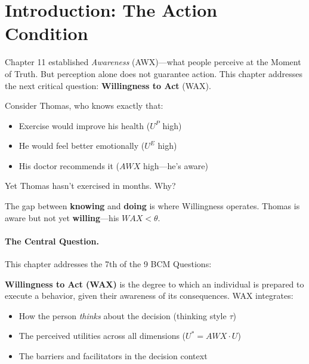 
\section{Introduction: The Action Condition}
\label{sec:12-intro}


Chapter 11 established \textit{Awareness} (AWX)---what people perceive at the
Moment of Truth. But perception alone does not guarantee action. This chapter
addresses the next critical question: \textbf{Willingness to Act} (WAX).

\begin{intuition}
Consider Thomas, who knows exactly that:
\begin{itemize}[nosep]
  \item Exercise would improve his health ($U^P$ high)
  \item He would feel better emotionally ($U^E$ high)
  \item His doctor recommends it ($AWX$ high---he's aware)
\end{itemize}
Yet Thomas hasn't exercised in months. Why?

The gap between \textbf{knowing} and \textbf{doing} is where Willingness operates.
Thomas is aware but not yet \textbf{willing}---his $WAX < \theta$.
\end{intuition}

\paragraph{The Central Question.}
This chapter addresses the 7th of the 9 BCM Questions:

\begin{center}
\end{center}

\begin{definition}
\textbf{Willingness to Act (WAX)} is the degree to which an individual is prepared
to execute a behavior, given their awareness of its consequences. WAX integrates:
\begin{itemize}[nosep]
\item How the person \textit{thinks} about the decision (thinking style $\tau$)
\item The perceived utilities across all dimensions ($U^* = AWX \cdot U$)
\item The barriers and facilitators in the decision context
\end{itemize}
\end{definition}

